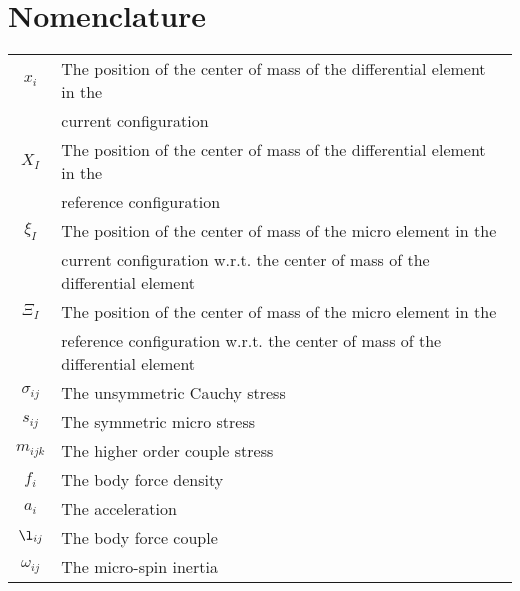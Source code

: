 \section{Nomenclature}

\begin{table}[htb!]
\centering
\begin{tabular}{|c|l|}
\hline
$x_i$ & The position of the center of mass of the differential element in the\\
& current configuration\\
\hline
$X_I$ & The position of the center of mass of the differential element in the\\
& reference configuration\\
\hline
$\xi_I$ & The position of the center of mass of the micro element in the\\
& current configuration w.r.t. the center of mass of the differential element\\
\hline
$\Xi_I$ & The position of the center of mass of the micro element in the\\
& reference configuration w.r.t. the center of mass of the differential element\\
\hline
$\sigma_{ij}$ & The unsymmetric Cauchy stress\\
\hline
$s_{ij}$ & The symmetric micro stress\\
\hline
$m_{ijk}$ & The higher order couple stress\\
\hline
$f_{i}$ & The body force density\\
\hline
$a_{i}$ & The acceleration\\
\hline
$\l_{ij}$ & The body force couple\\
\hline
$\omega_{ij}$ & The micro-spin inertia\\
\hline
\end{tabular}
\end{table}

\FloatBarrier